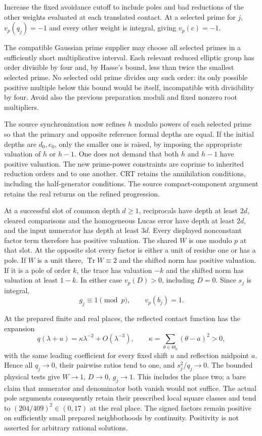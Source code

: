 \documentclass[11pt]{article}
\theoremstyle{remark}\newtheorem{remark}[theorem]{Remark}
\newcommand{\Tr}{\operatorname{Tr}}\newcommand{\Nm}{\operatorname{Nm}}
\begin{document}
Increase the fixed avoidance cutoff to include poles and bad reductions
of the other weights evaluated at each translated contact. At a selected
prime for $j$, $v_p(q_j)=-1$ and every other weight is integral, giving
$v_p(c)=-1$.

The compatible Gaussian prime supplier may choose all selected primes
in a sufficiently short multiplicative interval. Each relevant reduced
elliptic group has order divisible by four and, by Hasse's bound, less
than twice the smallest selected prime. No selected odd prime divides
any such order: its only possible positive multiple below this bound
would be itself, incompatible with divisibility by four. Avoid also the
previous preparation moduli and fixed nonzero root multipliers.

The source synchronization now refines $h$ modulo powers of each
selected prime so that the primary and opposite reference formal depths
are equal. If the initial depths are $d_0,e_0$, only the smaller one is
raised, by imposing the appropriate valuation of $h$ or $h-1$.
One does not demand that both $h$ and $h-1$ have positive valuation.
The new prime-power constraints are coprime to inherited reduction
orders and to one another. CRT retains the annihilation conditions,
including the half-generator conditions. The source compact-component
argument retains the real returns on the refined progression.

At a successful slot of common depth $d\ge1$, reciprocals have depth
at least $2d$, cleared comparisons and the homogeneous Lucas error have
depth at least $2d$, and the input numerator has depth at least $3d$.
Every displayed nonconstant factor term therefore has positive
valuation. The shared $W$ is one modulo $p$ at that slot. At the
opposite slot every factor is either a unit of residue one or has a
pole. If $W$ is a unit there, $\Tr W\equiv2$ and the shifted norm
has positive valuation. If it is a pole of order $k$, the trace has
valuation $-k$ and the shifted norm has valuation at least $1-k$.
In either case $v_p(D)>0$, including $D=0$. Since $s_j$ is integral,
\[
 g_j\equiv1\pmod p,\qquad v_p(b_j)=1.
\]

At the prepared finite and real places, the reflected contact function
has the expansion
\[
 q(\lambda+u)=\kappa\lambda^{-2}+O(\lambda^{-3}),\qquad
 \kappa=\sum_{\theta\in\Theta_0}(\theta-a)^2>0,
\]
with the same leading coefficient for every fixed shift $u$ and
reflection midpoint $a$. Hence all $q_j\to0$, their pairwise ratios
tend to one, and $s_j^2/q_j\to0$. The bounded physical tests give
$W\to1$, $D\to0$, $g_j\to1$. This includes the place two; a bare
claim that numerator and denominator both vanish would not suffice.
The actual pole arguments consequently retain their prescribed local
square classes and tend to $(204/409)^2\in(0,17)$ at the real place.
The signed factors remain positive on sufficiently small prepared
neighborhoods by continuity. Positivity is not asserted for arbitrary
rational solutions.
\end{document}
